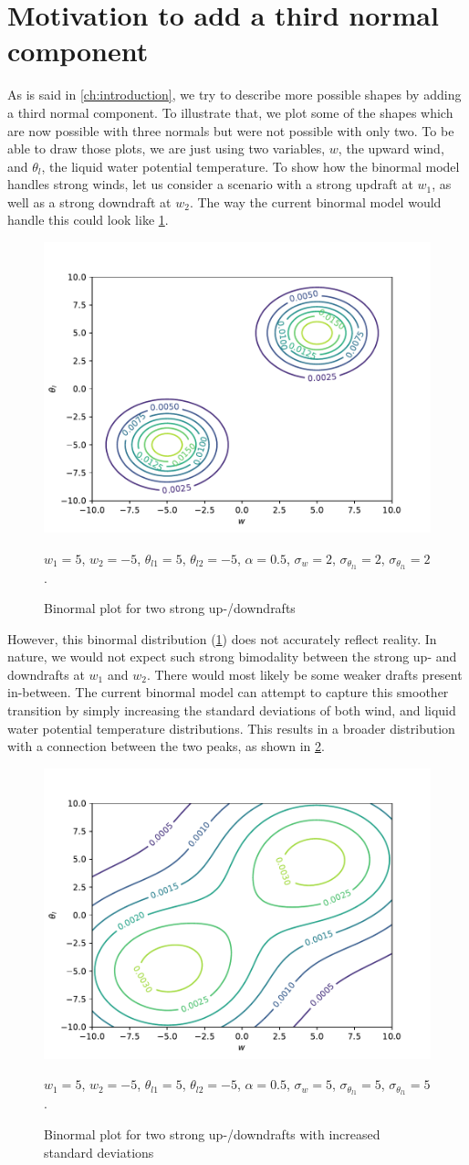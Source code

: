 \section{Motivation to add a third normal component}
\label{sec:motivation-to-add-a-third-normal-component}

As is said in \cref{ch:introduction},
we try to describe more possible shapes by adding a third normal component.
To illustrate that, we plot some of the shapes which are now possible with three normals
but were not possible with only two.
To be able to draw those plots, we are just using two variables, $w$, the upward wind,
and $\theta_l$, the liquid water potential temperature.
To show how the binormal model handles strong winds,
let us consider a scenario with a strong updraft at $w_1$, as well as a strong downdraft at $w_2$.
The way the current binormal model would handle this could look like \cref{fig:plot1}.
\begin{figure}[!htb]
    \centering
    \includegraphics[width=.48\textwidth]{include/figures/plot1}
    \caption{Binormal plot for two strong up-/downdrafts}
    \label{fig:plot1}
    $w_1 = 5$, $w_2 = -5$, $\theta_{l1} = 5$, $\theta_{l2} = -5$,
    $\alpha = 0.5$, $\sigma_w = 2$, $\sigma_{\theta_{l1}} = 2$, $\sigma_{\theta_{l1}} = 2$.
\end{figure}
However, this binormal distribution (\cref{fig:plot1}) does not accurately reflect reality.
In nature, we would not expect such strong bimodality between the strong up-
and downdrafts at $w_1$ and $w_2$.
There would most likely be some weaker drafts present in-between.
The current binormal model can attempt to capture this smoother transition
by simply increasing the standard deviations of both wind,
and liquid water potential temperature distributions.
This results in a broader distribution with a connection between the two peaks,
as shown in \cref{fig:plot2}.
\begin{figure}[!htb]
    \centering
    \includegraphics[width=.5\textwidth]{include/figures/plot2}
    \caption{Binormal plot for two strong up-/downdrafts with increased standard deviations}
    \label{fig:plot2}
    $w_1 = 5$, $w_2 = -5$, $\theta_{l1} = 5$, $\theta_{l2} = -5$,
    $\alpha = 0.5$, $\sigma_w = 5$, $\sigma_{\theta_{l1}} = 5$, $\sigma_{\theta_{l1}} = 5$.
\end{figure}
